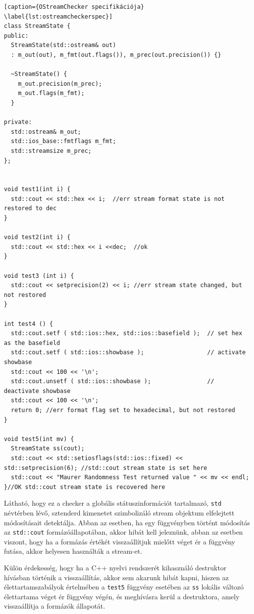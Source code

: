 \documentclass[a4paper,12pt]{report}
\begin{document}
\begin{lstlisting}[caption={OStreamChecker specifikációja}
\label{lst:ostreamcheckerspec}]
class StreamState {
public:
  StreamState(std::ostream& out)
  : m_out(out), m_fmt(out.flags()), m_prec(out.precision()) {}

  ~StreamState() {
    m_out.precision(m_prec);
    m_out.flags(m_fmt);
  }

private:
  std::ostream& m_out;
  std::ios_base::fmtflags m_fmt;
  std::streamsize m_prec;
};


void test1(int i) {
  std::cout << std::hex << i;  //err stream format state is not restored to dec
}

void test2(int i) {
  std::cout << std::hex << i <<dec;  //ok
}

void test3 (int i) {
  std::cout << setprecision(2) << i; //err stream state changed, but not restored
}

int test4 () {
  std::cout.setf ( std::ios::hex, std::ios::basefield );  // set hex as the basefield
  std::cout.setf ( std::ios::showbase );                  // activate showbase
  std::cout << 100 << '\n';
  std::cout.unsetf ( std::ios::showbase );                // deactivate showbase
  std::cout << 100 << '\n';
  return 0; //err format flag set to hexadecimal, but not restored
}

void test5(int mv) {
  StreamState ss(cout);
  std::cout << std::setiosflags(std::ios::fixed) << std::setprecision(6); //std::cout stream state is set here
  std::cout << "Maurer Randomness Test returned value " << mv << endl;
}//OK std::cout stream state is recovered here
\end{lstlisting}

Látható, hogy ez a checker a globális státuszinformációt tartalmazó, \texttt{std} névtérben lévő, sztenderd kimenetet szimbolizáló stream objektum elfelejtett módosításait detektálja. Abban az esetben, ha egy függvényben történt módosítás az \texttt{std::cout} formázóállapotában, akkor hibát kell jeleznünk, abban az esetben viszont, hogy ha a formázás értékét visszaállítjuk mielőtt véget ér a függvény futása, akkor helyesen használták a stream-et.

Külön érdekesség, hogy ha a C++ nyelvi rendszerét kihasználó destruktor hívásban történik a visszaállítás, akkor sem akarunk hibát kapni, hiszen az élettartamszabályok értelmében a \texttt{test5} függvény esetében az \texttt{ss} lokális változó élettartama véget ér függvény végén, és meghívásra kerül a destruktora, amely visszaállítja a formázók állapotát.
\end{document}
